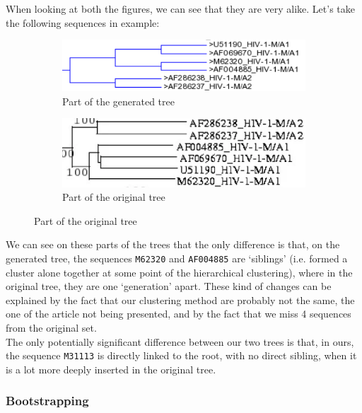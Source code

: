 \documentclass[english,13pt,a4paper]{article}
\theoremstyle{definition}
\theoremstyle{remark}
\theoremstyle{defstyle}
\begin{document}
When looking at both the figures, we can see that they are very alike. Let's take the following sequences in example:

\begin{figure}[H]
    \centering
    \begin{subfigure}{0.48\textwidth}
        \centering
        \includegraphics[width=\textwidth]{Images/Example_66.png}
        \caption{Part of the generated tree}
    \end{subfigure}
    \hfill
    \begin{subfigure}{0.48\textwidth}
        \centering
        \includegraphics[width=\textwidth]{Images/Example_Orig66.png}
        \caption{Part of the original tree}
    \end{subfigure}
\end{figure}

We can see on these parts of the trees that the only difference is that, on the generated tree, the sequences \texttt{M62320} and \texttt{AF004885} are `siblings' (i.e. formed a cluster alone together at some point of the hierarchical clustering), where in the original tree, they are one `generation' apart. These kind of changes can be explained by the fact that our clustering method are probably not the same, the one of the article not being presented, and by the fact that we miss 4 sequences from the original set.\\

The only potentially significant difference between our two trees is that, in ours, the sequence \texttt{M31113} is directly linked to the root, with no direct sibling, when it is a lot more deeply inserted in the original tree. 

\subsubsection{Bootstrapping}
\end{document}
